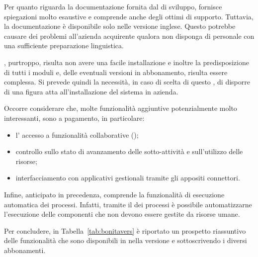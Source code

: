 Per quanto riguarda la documentazione fornita dal  di sviluppo, fornisce spiegazioni molto esaustive e comprende anche degli ottimi  di supporto. 
Tuttavia, la documentazione è disponibile solo nelle versione inglese. Questo potrebbe causare dei problemi all'azienda acquirente qualora non disponga di personale con una sufficiente preparazione linguistica.

\progname, purtroppo, risulta non avere una facile installazione e inoltre la predisposizione di tutti i moduli e, delle eventuali versioni in abbonamento, risulta essere complessa. Si prevede quindi la necessità, in caso di scelta di questo \sw, di disporre di una figura atta all'installazione del sistema in azienda. 

Occorre considerare che, molte funzionalità aggiuntive potenzialmente molto interessanti, sono a pagamento, in particolare:
\begin{itemize}
  \item l' accesso a funzionalità collaborative ();
  \item controllo sullo stato di avanzamento delle sotto-attività e sull'utilizzo delle risorse;
  \item interfacciamento con applicativi gestionali  tramite gli appositi connettori.
\end{itemize}

Infine, anticipato in precedenza, \progname comprende la funzionalità di esecuzione automatica dei processi. Infatti, tramite il  dei processi è possibile automatizzarne l'esecuzione delle componenti che non devono essere gestite da risorse umane.

Per concludere, in Tabella~\ref{tab:bonitavers} è riportato un prospetto riassuntivo delle funzionalità che sono disponibili in \progname nella versione  e sottoscrivendo i diversi abbonamenti.

